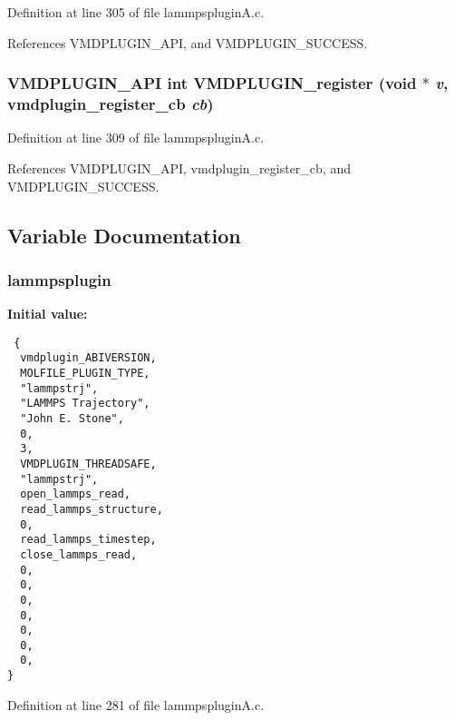Definition at line 305 of file lammpsplugin\-A.c.

References VMDPLUGIN\_\-API, and VMDPLUGIN\_\-SUCCESS.
\subsubsection{\setlength{\rightskip}{0pt plus 5cm}VMDPLUGIN\_\-API int VMDPLUGIN\_\-register (void $\ast$ {\em v}, {\bf vmdplugin\_\-register\_\-cb} {\em cb})}\label{lammpspluginA_8c_a9}




Definition at line 309 of file lammpsplugin\-A.c.

References VMDPLUGIN\_\-API, vmdplugin\_\-register\_\-cb, and VMDPLUGIN\_\-SUCCESS.

\subsection{Variable Documentation}
\subsubsection{ lammpsplugin\hspace{0.3cm}{\tt  [static]}}\label{lammpspluginA_8c_a1}


{\bf Initial value:}

\footnotesize\begin{verbatim} {
  vmdplugin_ABIVERSION,
  MOLFILE_PLUGIN_TYPE,                         
  "lammpstrj",                                 
  "LAMMPS Trajectory",                         
  "John E. Stone",                             
  0,                                           
  3,                                           
  VMDPLUGIN_THREADSAFE,                        
  "lammpstrj",                                 
  open_lammps_read,
  read_lammps_structure,
  0,
  read_lammps_timestep,
  close_lammps_read,
  0,                            
  0,
  0,
  0,
  0,                            
  0,                            
  0,
}\end{verbatim}\normalsize 


Definition at line 281 of file lammpsplugin\-A.c.